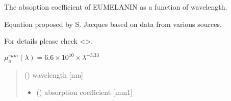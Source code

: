 \documentclass[letterpaper,10pt,english]{sphinxmanual}
\begin{document}

\begin{fulllineitems}
\label{\detokenize{03_absorption_coefficient:skinoptics.absorption_coefficient.mua_eum_Jacques}}
\pysigstartsignatures
{}
\pysigstopsignatures
\begin{DUlineblock}{0em}
\item[] The absoption coefficient of EUMELANIN as a function of wavelength.
\item[] Equation proposed by S. Jacques based on data from various sources.
\item[] For details please check \textless{}\textgreater{}.
\end{DUlineblock}

\sphinxAtStartPar
\(\mu_a^{eum} (\lambda) = 6.6 \times 10^{10} \times \lambda^{-3.33}\)
\begin{quote}\begin{description}
\sphinxAtStartPar
{} () \textendash{} wavelength {[}nm{]}

\sphinxAtStartPar
\begin{itemize}
\item {} 
\sphinxAtStartPar
{} () \textendash{} absorption coefficient {[}mm\sphinxhyphen{}1{]}

\end{itemize}


\end{description}\end{quote}

\end{fulllineitems}

\end{document}
